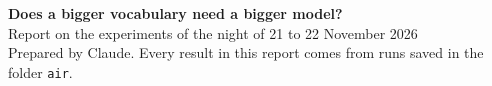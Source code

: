 \documentclass[10pt,letterpaper]{article}
\newcommand{\s}[1]{\texttt{#1}}          %
\begin{document}
\begin{center}
{\LARGE\bfseries Does a bigger vocabulary need a bigger model?}\\[5pt]
{\large Report on the experiments of the night of 21 to 22 November 2026}\\[3pt]
{\small\color{soft} Prepared by Claude. Every result in this report comes from runs saved in the folder \s{air}.}
\end{center}












\end{document}
